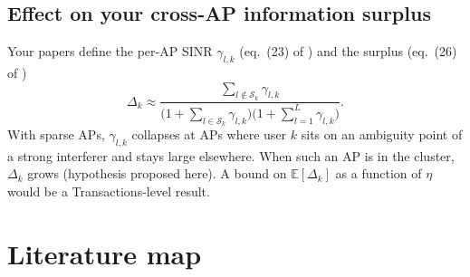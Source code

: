 \documentclass[11pt]{article}
\begin{document}
\subsection{Effect on your cross-AP information surplus}
Your papers define the per-AP SINR $\gamma_{l,k}$ (eq.~(23) of \cite{haider2026vtc}) and the surplus (eq.~(26) of \cite{haider2026vtc})
\begin{equation}
  \Delta_k\approx
  \frac{\sum_{l\notin\mathcal S_k}\gamma_{l,k}}{\big(1+\sum_{l\in\mathcal S_k}\gamma_{l,k}\big)\big(1+\sum_{l=1}^L\gamma_{l,k}\big)} .
\end{equation}
With sparse APs, $\gamma_{l,k}$ collapses at APs where user $k$ sits on an ambiguity point of a strong interferer and stays large elsewhere. When such an AP is in the cluster, $\Delta_k$ grows (hypothesis proposed here). A bound on $\mathbb E[\Delta_k]$ as a function of $\eta$ would be a Transactions-level result.

\section{Literature map}
\label{sec:lit}
\end{document}
